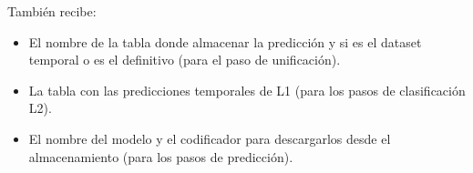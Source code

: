 También recibe:
\begin{itemize}
	\item El nombre de la tabla donde almacenar la predicción y si es el dataset temporal o es el definitivo (para el paso de unificación).
	\item La tabla con las predicciones temporales de L1 (para los pasos de clasificación L2).
	\item El nombre del modelo y el codificador para descargarlos desde el almacenamiento (para los pasos de predicción).
\end{itemize}
